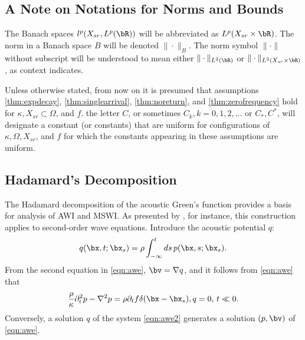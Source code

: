 \subsection{A Note on Notations  for Norms and Bounds}
The Banach spaces
$l^p(X_{sr},L^p(\bR))$ will be abbreviated as $L^p(X_{sr} \times
\bR)$. The norm in a Banach space $B$ will be denoted
$\|\cdot\|_{B}$. The norm symbol
$\|\cdot\|$ without subscript will be understood to mean either
$\|\cdot\|_{L^2(\bR)}$ or $\|\cdot\|_{L^2(X_{sr}\times
  \bR)}$, as context indicates.



Unless otherwise stated, from now on it is presumed that assumptions
\ref{thm:expdecay}, \ref{thm:singlearrival}, \ref{thm:noreturn},
and \ref{thm:zerofrequency} hold for $\kappa, X_{sr} \subset \Omega$,
  and $f$. the letter $C$, or sometimes $C_k,
k=0,1,2,...$ or
$C_*,C^*$, will designate a constant (or constants) that are uniform
for configurations of $\kappa, \Omega, X_{sr}$, and $f$ for which the
constants appearing in these assumptions are uniform. 

\subsection{Hadamard's Decomposition}
The Hadamard decomposition of the acoustic Green's function \cite[]{Friedlander:75,Qian:JCP24} provides a
basis for analysis of AWI and MSWI. As presented by
\cite{Friedlander:75}, for instance, this construction applies to
second-order wave equations. Introduce the acoustic potential $q$:
\begin{equation}
  \label{eqn:acpo}
  q (\bx,t;\bx_s)  = \rho \int_{-\infty}^t ds \, p(\bx,s;\bx_s).
\end{equation}
From the second equation in \ref{eqn:awe}, $\bv = \nabla q$, and it follows from \ref{eqn:awe} that 
\begin{equation}
  \label{eqn:awe2}
  \frac{\rho}{\kappa} \partial_t^2 p - \nabla^2 p = \rho \partial_t f\delta(\bx-\bx_s), \nonumber \\
  q=0, \, t \ll 0.
\end{equation}
Conversely, a solution $q$ of the system \ref{eqn:awe2} generates a
solution $(p,\bv)$ of \ref{eqn:awe}. 

